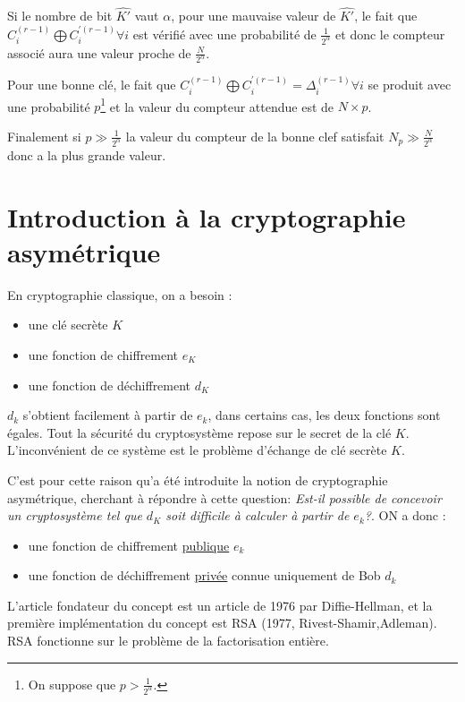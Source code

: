 \documentclass[a4paper, 10pt]{thesis}
\begin{document}
Si le nombre de bit $\hat{K'}$ vaut $\alpha$, pour une mauvaise valeur de $\hat{K'}$, le fait que
$C_i^{(r-1)} \bigoplus C_i^{'(r-1)} \forall i$ est vérifié avec une probabilité de $\displaystyle
\frac{1}{2^\alpha}$ et donc le compteur associé aura une valeur proche de $\displaystyle
\frac{N}{2^\alpha}$.

Pour une bonne clé, le fait que $C_i^{(r-1)} \bigoplus C_i^{'(r-1)} = \Delta_i^{(r-1)} \forall i$ se
produit avec une probabilité $p$\footnote{On suppose que $p > \frac{1}{2^\alpha}$.} et la valeur du
compteur attendue est de $N \times p$.

Finalement si $p \gg \frac{1}{2^\alpha}$ la valeur du compteur de la bonne clef satisfait $N_p \gg
\frac{N}{2^\alpha}$ donc a la plus grande valeur.

\chapter{Introduction \`a la cryptographie asym\'etrique}

En cryptographie classique, on a besoin :
\begin{itemize}
    \item une clé secrète $K$
    \item une fonction de chiffrement $e_K$
    \item une fonction de déchiffrement $d_K$
\end{itemize}
$d_k$ s'obtient facilement à partir de $e_k$, dans certains cas, les deux fonctions sont égales.
Tout la sécurité du cryptosystème repose sur le secret de la clé $K$. L'inconvénient de ce système
est le problème d'échange de clé secrète $K$.

C'est pour cette raison qu'a été introduite la notion de cryptographie asymétrique, cherchant à
répondre à cette question: \emph{Est-il possible de concevoir un cryptosystème tel que $d_K$ soit
difficile à calculer à partir de $e_k$?}. ON a donc :
\begin{itemize}
    \item une fonction de chiffrement \underline{publique} $e_k$
    \item une fonction de déchiffrement \underline{privée} connue uniquement de Bob $d_k$
\end{itemize}

L'article fondateur du concept est un article de 1976 par Diffie-Hellman, et la première
implémentation du concept est RSA (1977, Rivest-Shamir,Adleman). RSA fonctionne sur le problème de
la factorisation entière.
\end{document}
